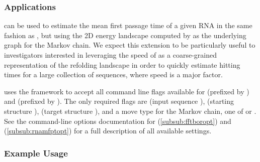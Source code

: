 \documentclass[11pt]{article}
\begin{document}
\begin{itemize}
\begin{itemize}
    \end{itemize}
\end{itemize}



\subsubsection{Applications} \label{subsub:fftmfptapp}

\fftmfpt can be used to estimate the mean first passage time of a given RNA in the same fashion as \rnamfpt, but using the 2D energy landscape computed by \fft as the underlying graph for the Markov chain. We expect this extension to be particularly useful to investigators interested in leveraging the speed of \fft as a coarse-grained representation of the refolding landscape in order to quickly estimate hitting times for a large collection of sequences, where speed is a major factor.

\fftmfpt uses the \multiParam framework to accept all command line flags available for \fft (prefixed by ) and \rnamfpt (prefixed by ). The only required flags are  (input sequence \s),  (starting structure \A),  (target structure \B), and a move type for the Markov chain, one of  or .
See the command-line options documentation for \fft (\ref{subsub:fftboropt}) and \rnamfpt (\ref{subsub:rnamfptopt}) for a full description of all available settings.

\subsubsection{Example Usage} \label{subsub:fftmfptex}
\end{document}
